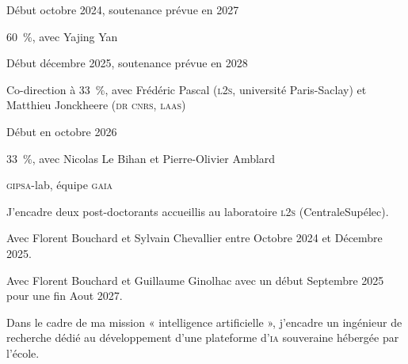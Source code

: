 
\begin{cvfields}
  \item[Calendrier] Début octobre 2024, soutenance prévue en 2027
  \item[Encadrement] 60~\%, avec Yajing Yan
  \item[Publications] 
\end{cvfields}

\begin{cvfields}
  \item[Calendrier] Début décembre 2025, soutenance prévue en 2028
  \item[Encadrement] Co-direction à 33~\%, avec Frédéric Pascal (\textsc{l2s},
    université Paris-Saclay) et Matthieu Jonckheere (\textsc{dr cnrs},
    \textsc{laas})
\end{cvfields}

\begin{cvfields}
  \item[Calendrier] Début en octobre 2026
  \item[Encadrement] 33~\%, avec Nicolas Le Bihan et Pierre-Olivier Amblard
  \item[Laboratoire] \textsc{gipsa}-lab, équipe \textsc{gaia}
\end{cvfields}


J'encadre deux post-doctorants accueillis au laboratoire \textsc{l2s}
(CentraleSupélec).

Avec Florent Bouchard et Sylvain Chevallier entre Octobre 2024 et Décembre 2025.

Avec Florent Bouchard et Guillaume Ginolhac avec un début Septembre 2025 pour une fin Aout 2027.


Dans le cadre de ma mission « intelligence artificielle », j'encadre un
ingénieur de recherche dédié au développement d'une plateforme d'\textsc{ia}
souveraine hébergée par l'école.

